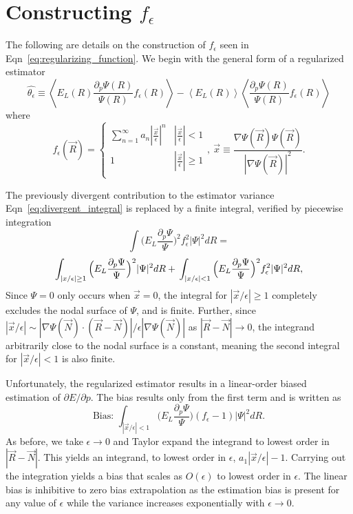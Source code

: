 \documentclass[twocolumn]{revtex4-1}
\begin{document}
%


\appendix*
\section{Constructing $f_\epsilon$}
The following are details on the construction of $f_\epsilon$ seen in Eqn~\ref{eq:regularizing_function}. 
We begin with the general form of a regularized estimator
$$
\hat{\theta_\epsilon} \equiv
\left\langle E_L(R) \frac{\partial_p \Psi(R)}{\Psi(R)} f_\epsilon(R) \right\rangle - \left\langle E_L(R) \right \rangle \left \langle \frac{\partial_p \Psi(R)}{\Psi(R)} f_\epsilon(R) \right\rangle
$$
where 
\begin{equation}
f_\epsilon(\vec{R}) = \begin{cases} 
      \sum_{n=1}^{\infty} a_n |\frac{\vec{x}}{\epsilon}|^n & |\frac{\vec{x}}{\epsilon}| < 1 \\
      1 & |\frac{\vec{x}}{\epsilon}| \ge 1 \\
   \end{cases},\ \vec{x} \equiv \frac{\nabla \Psi(\vec{R}) \Psi(\vec{R})}{|\nabla \Psi(\vec{R})|^2}.
\end{equation} 

The previously divergent contribution to the estimator variance Eqn~\ref{eq:divergent_integral} is replaced by a finite integral, verified by piecewise integration
$$
\int \Big(E_L\frac{\partial_p\Psi}{\Psi}\Big)^2 f_\epsilon^2 |\Psi|^2 dR = $$
$$ \int_{|x/\epsilon|\geq 1} \Big(E_L\frac{\partial_p\Psi}{\Psi}\Big)^2 |\Psi|^2 dR +\\ \int_{|x/\epsilon|< 1} \Big(E_L\frac{\partial_p\Psi}{\Psi}\Big)^2 f_\epsilon^2 |\Psi|^2 dR,
$$
Since $\Psi = 0$ only occurs when $\vec{x} = 0$, the integral for $|\vec{x}/\epsilon|\geq 1$ completely excludes the nodal surface of $\Psi$, and is finite. 
Further, since $|\vec{x}/\epsilon| \sim |\nabla\Psi(\vec{N}) \cdot (\vec{R}-\vec{N})|/\epsilon|\nabla  \Psi(\vec{N})|$ as $|\vec{R} - \vec{N}| \rightarrow 0$, the integrand arbitrarily close to the nodal surface is a constant, meaning the second integral for $|\vec{x}/\epsilon| < 1$ is also finite.

Unfortunately, the regularized estimator results in a linear-order biased estimation of $\partial E/\partial p$.
The bias results only from the first term and is written as 
$$
\text{Bias: } \int_{|\vec{x}/\epsilon|< 1} \Big(E_L\frac{\partial_p\Psi}{\Psi}\Big) (f_\epsilon - 1)|\Psi|^2 dR.
$$
As before, we take $\epsilon \rightarrow 0$ and Taylor expand the integrand to lowest order in $|\vec{R}-\vec{N}|$.
This yields an integrand, to lowest order in $\epsilon$, $a_1|\vec{x}/\epsilon| - 1$.
Carrying out the integration yields a bias that scales as $O(\epsilon)$ to lowest order in $\epsilon$.
The linear bias is inhibitive to zero bias extrapolation as the estimation bias is present for any value of $\epsilon$ while the variance increases exponentially with $\epsilon \rightarrow 0$.
\end{document}
